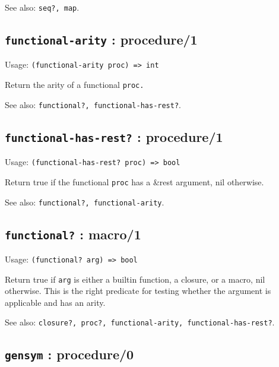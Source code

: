 \documentclass[
]{article}
\newcommand{\passthrough}[1]{#1}
\begin{document}
See also: \passthrough{\lstinline!seq?, map!}.

\hypertarget{functional-arity-procedure1-1}{%
\subsection{\texorpdfstring{\texttt{functional-arity} :
procedure/1}{functional-arity : procedure/1}}\label{functional-arity-procedure1-1}}

Usage: \passthrough{\lstinline!(functional-arity proc) => int!}

Return the arity of a functional \passthrough{\lstinline!proc.!}

See also: \passthrough{\lstinline!functional?, functional-has-rest?!}.

\hypertarget{functional-has-rest-procedure1-1}{%
\subsection{\texorpdfstring{\texttt{functional-has-rest?} :
procedure/1}{functional-has-rest? : procedure/1}}\label{functional-has-rest-procedure1-1}}

Usage: \passthrough{\lstinline!(functional-has-rest? proc) => bool!}

Return true if the functional \passthrough{\lstinline!proc!} has a
\&rest argument, nil otherwise.

See also: \passthrough{\lstinline!functional?, functional-arity!}.

\hypertarget{functional-macro1-1}{%
\subsection{\texorpdfstring{\texttt{functional?} :
macro/1}{functional? : macro/1}}\label{functional-macro1-1}}

Usage: \passthrough{\lstinline!(functional? arg) => bool!}

Return true if \passthrough{\lstinline!arg!} is either a builtin
function, a closure, or a macro, nil otherwise. This is the right
predicate for testing whether the argument is applicable and has an
arity.

See also:
\passthrough{\lstinline!closure?, proc?, functional-arity, functional-has-rest?!}.

\hypertarget{gensym-procedure0-1}{%
\subsection{\texorpdfstring{\texttt{gensym} :
procedure/0}{gensym : procedure/0}}\label{gensym-procedure0-1}}
\end{document}
